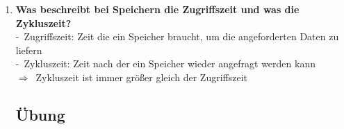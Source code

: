 \documentclass[a4paper,12pt]{article}
\newcommand{\questionnopage}[2]{\pagebreak[3]\item {\textbf{#1?}}#2}
\newcommand{\catchword}[1]{\\-\ #1}
\newcommand{\result}[1]{\\$\Rightarrow$\ #1}
\begin{document}
\begin{enumerate}
  \questionnopage{Was beschreibt bei Speichern die Zugriffszeit und was die Zykluszeit}
  {
    \catchword{Zugriffszeit: Zeit die ein Speicher braucht, um die angeforderten Daten zu liefern}
    \catchword{Zykluszeit: Zeit nach der ein Speicher wieder angefragt werden kann}
    \result {Zykluszeit ist immer größer gleich der Zugriffszeit}
  }

  \subsection{Übung}

\end{enumerate}
\end{document}
